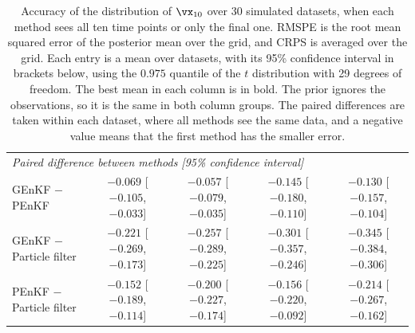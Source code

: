 \documentclass[12pt]{article}
\begin{document}
\begin{table}[tbp]
\begin{tabular}{lcccc}
        \midrule
        \multicolumn{5}{l}{\emph{Paired difference between methods [95\% confidence interval]}} \\
        \shortstack[l]{GEnKF $-$ PEnKF \\ {\scriptsize\phantom{[0]}}} & \shortstack{$-0.069$ \\ {\scriptsize [$-0.105$, $-0.033$]}} & \shortstack{$-0.057$ \\ {\scriptsize [$-0.079$, $-0.035$]}} & \shortstack{$-0.145$ \\ {\scriptsize [$-0.180$, $-0.110$]}} & \shortstack{$-0.130$ \\ {\scriptsize [$-0.157$, $-0.104$]}} \\
        \shortstack[l]{GEnKF $-$ Particle filter \\ {\scriptsize\phantom{[0]}}} & \shortstack{$-0.221$ \\ {\scriptsize [$-0.269$, $-0.173$]}} & \shortstack{$-0.257$ \\ {\scriptsize [$-0.289$, $-0.225$]}} & \shortstack{$-0.301$ \\ {\scriptsize [$-0.357$, $-0.246$]}} & \shortstack{$-0.345$ \\ {\scriptsize [$-0.384$, $-0.306$]}} \\
        \shortstack[l]{PEnKF $-$ Particle filter \\ {\scriptsize\phantom{[0]}}} & \shortstack{$-0.152$ \\ {\scriptsize [$-0.189$, $-0.114$]}} & \shortstack{$-0.200$ \\ {\scriptsize [$-0.227$, $-0.174$]}} & \shortstack{$-0.156$ \\ {\scriptsize [$-0.220$, $-0.092$]}} & \shortstack{$-0.214$ \\ {\scriptsize [$-0.267$, $-0.162$]}} \\
        \bottomrule
    \end{tabular}
    \caption{Accuracy of the distribution of $\vx_{10}$ over 30 simulated datasets,
    when each method sees all ten time points or only the final one. RMSPE is the
    root mean squared error of the posterior mean over the grid, and CRPS is
    averaged over the grid. Each entry is a mean over datasets, with its 95\%
    confidence interval in brackets below, using the $0.975$ quantile of the $t$
    distribution with 29 degrees of freedom. The best mean in each column is in
    bold. The prior ignores the observations, so it is the same in both column
    groups. The paired differences are taken within each dataset, where all
    methods see the same data, and a negative value means that the first method
    has the smaller error.}
    \label{tab:replicates}
\end{table}
\end{document}
